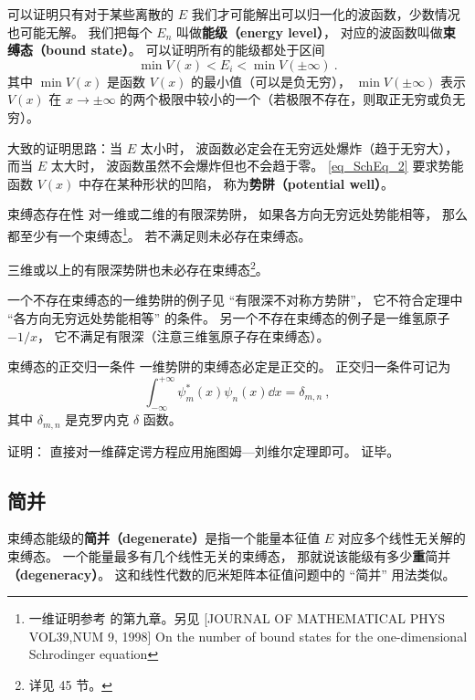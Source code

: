 可以证明只有对于某些离散的 $E$ 我们才可能解出可以归一化的波函数，少数情况也可能无解。 我们把每个 $E_n$ 叫做\textbf{能级（energy level）}， 对应的波函数叫做\textbf{束缚态（bound state）}。 可以证明所有的能级都处于区间
\begin{equation}\label{eq_SchEq_2}
\min V(x) < E_i < \min V(\pm\infty)~.
\end{equation}
其中 $\min V(x)$ 是函数 $V(x)$ 的最小值（可以是负无穷）， $\min V(\pm\infty)$ 表示 $V(x)$ 在 $x\to\pm\infty$ 的两个极限中较小的一个（若极限不存在，则取正无穷或负无穷）。

大致的证明思路：当 $E$ 太小时， 波函数必定会在无穷远处爆炸（趋于无穷大）， 而当 $E$ 太大时， 波函数虽然不会爆炸但也不会趋于零。 \autoref{eq_SchEq_2} 要求势能函数 $V(x)$ 中存在某种形状的凹陷， 称为\textbf{势阱（potential well）}。

\begin{theorem}{束缚态存在性}
对一维或二维的有限深势阱， 如果各方向无穷远处势能相等， 那么都至少有一个束缚态\footnote{一维证明参考 \cite{Teschl} 的第九章。另见 [JOURNAL OF MATHEMATICAL PHYS VOL39,NUM 9, 1998] On the number of bound states for the one-dimensional Schrodinger equation}。 若不满足则未必存在束缚态。

三维或以上的有限深势阱也未必存在束缚态\footnote{详见 \cite{Landau} 45 节。}。
\end{theorem}
一个不存在束缚态的一维势阱的例子见 “有限深不对称方势阱”， 它不符合定理中 “各方向无穷远处势能相等” 的条件。 另一个不存在束缚态的例子是一维氢原子 $-1/x$， 它不满足有限深（注意三维氢原子存在束缚态）。

\begin{theorem}{束缚态的正交归一条件}
一维势阱的束缚态必定是正交的。 正交归一条件可记为
\begin{equation}
\int_{-\infty}^{+\infty} \psi^*_m(x) \psi_n(x)\dd{x} = \delta_{m,n}~,
\end{equation}
其中 $\delta_{m,n}$ 是克罗内克 $\delta$ 函数。
\end{theorem}
证明： 直接对一维薛定谔方程应用施图姆—刘维尔定理即可。 证毕。

\subsection{简并}
束缚态能级的\textbf{简并（degenerate）}是指一个能量本征值 $E$ 对应多个线性无关解的束缚态。 一个能量最多有几个线性无关的束缚态， 那就说该能级有多少\textbf{重}简并\textbf{（degeneracy）}。 这和线性代数的厄米矩阵本征值问题中的 “简并” 用法类似。

